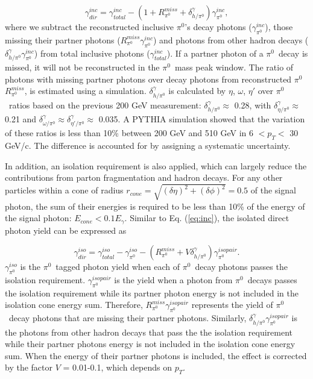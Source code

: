 \documentclass[twocolumn,letterpaper,aps,prl,longbibliography,superscriptaddress,floatfix]{revtex4-2}
\newcommand{\pT}{\ensuremath{p_T}}
\newcommand{\pizero}{\ensuremath{\pi^0}}
\begin{document}
\begin{equation} \label{eq:inc}
\gamma_{dir}^{inc} = \gamma_{total}^{inc} - \left( 1 + R_{\pi^0}^{miss} + \delta_{h/\pi^0}^{\gamma} \right) \gamma_{\pi^0}^{inc},
\end{equation}
where we subtract the reconstructed inclusive \pizero's decay photons ($\gamma_{\pi^0}^{inc}$), those missing their partner photons ($R_{\pi^0}^{miss}\gamma_{\pi^0}^{inc}$) and photons from other hadron decays ($\delta_{h/\pi^0}^{\gamma}\gamma_{\pi^0}^{inc}$) from total inclusive photons ($\gamma_{total}^{inc}$). If a partner photon of a \pizero\ decay is missed, it will not be reconstructed in the \pizero\ mass peak window. The ratio of photons with missing partner photons over decay photons from reconstructed \pizero\, $R_{\pi^0}^{miss}$, is estimated using a simulation.
$\delta_{h/\pi^0}^{\gamma}$ is calculated by $\eta$, $\omega$, $\eta'$ over \pizero\ ratios based on the previous 200 GeV measurement\cite{PhysRevD.83.052004}: $\delta_{h/\pi^0}^{\gamma} \approx$ 0.28, with $\delta_{\eta/\pi^0}^{\gamma} \approx$ 0.21 and $\delta_{\omega/\pi^0}^{\gamma} \approx \delta_{\eta'/\pi^0}^{\gamma}  \approx$ 0.035. A PYTHIA \cite{Sjostrand:2006za} simulation showed that the variation of these ratios is less than 10\% between 200 GeV and 510 GeV in 6 $< p_T <$ 30 GeV/c. The difference is accounted for by assigning a systematic uncertainty.

In addition, an isolation requirement is also applied, which can largely reduce the contributions from parton fragmentation and hadron decays. For any other particles within a cone of radius $r_{cone} = \sqrt{(\delta\eta)^2 + (\delta\phi)^2} = 0.5$ of the signal photon, the sum of their energies is required to be less than 10\% of the energy of the signal photon: $E_{cone} < 0.1 E_{\gamma}$. Similar to Eq. (\ref{eq:inc}), the isolated direct photon yield can be expressed as


\begin{equation} \label{eq:iso}
\gamma_{dir}^{iso} = \gamma_{total}^{iso} - \gamma_{\pi^0}^{iso} - \left( R_{\pi^0}^{miss} + V\delta_{h/\pi^0}^{\gamma} \right) \gamma_{\pi^0}^{isopair}.
\end{equation}
$\gamma_{\pi^0}^{iso}$ is the \pizero \ tagged photon yield when each of \pizero\ decay photons passes the isolation requirement. $\gamma_{\pi^0}^{isopair}$ is the yield when a photon from \pizero\ decays passes the isolation requirement while its partner photon energy is not included in the isolation cone energy sum. Therefore, $R_{\pi^0}^{miss}\gamma_{\pi^0}^{isopair}$ represents the yield of \pizero\ decay photons that are missing their partner photons. Similarly, $\delta_{h/\pi^0}^{\gamma}\gamma_{\pi^0}^{isopair}$ is the photons from other hadron decays that pass the the isolation requirement while their partner photons energy is not included in the isolation cone energy sum. When the energy of their partner photons is included, the effect is corrected by the factor $V$ = 0.01-0.1, which depends on \pT.
\end{document}
